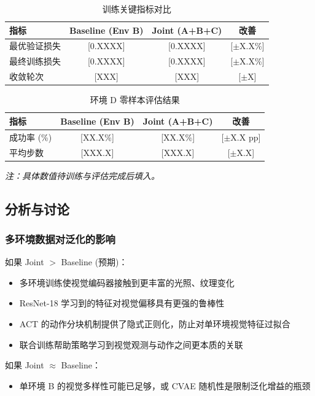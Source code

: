 \documentclass[12pt,a4paper]{ctexart}
\begin{document}
\begin{table}[H]
\centering
\caption{训练关键指标对比}
\begin{tabular}{@{}lccc@{}}
\toprule
\textbf{指标} & \textbf{Baseline (Env B)} & \textbf{Joint (A+B+C)} & \textbf{改善} \\
\midrule
最优验证损失 & [0.XXXX] & [0.XXXX] & [$\pm$X.X\%] \\
最终训练损失 & [0.XXXX] & [0.XXXX] & [$\pm$X.X\%] \\
收敛轮次     & [XXX]   & [XXX]      & [$\pm$X] \\
\bottomrule
\end{tabular}
\end{table}

\begin{table}[H]
\centering
\caption{环境 D 零样本评估结果}
\begin{tabular}{@{}lccc@{}}
\toprule
\textbf{指标} & \textbf{Baseline (Env B)} & \textbf{Joint (A+B+C)} & \textbf{改善} \\
\midrule
成功率 (\%) & [XX.X\%] & [XX.X\%] & [$\pm$X.X pp] \\
平均步数   & [XXX.X]  & [XXX.X]  & [$\pm$X.X] \\
\bottomrule
\end{tabular}
\end{table}

\textit{注：具体数值待训练与评估完成后填入。}

\subsection{分析与讨论}

\subsubsection{多环境数据对泛化的影响}

如果 Joint $>$ Baseline (预期)：
\begin{itemize}[leftmargin=*]
    \item 多环境训练使视觉编码器接触到更丰富的光照、纹理变化
    \item ResNet-18 学习到的特征对视觉偏移具有更强的鲁棒性
    \item ACT 的动作分块机制提供了隐式正则化，防止对单环境视觉特征过拟合
    \item 联合训练帮助策略学习到视觉观测与动作之间更本质的关联
\end{itemize}

如果 Joint $\approx$ Baseline：
\begin{itemize}[leftmargin=*]
    \item 单环境 B 的视觉多样性可能已足够，或 CVAE 随机性是限制泛化增益的瓶颈
\end{itemize}
\end{document}

